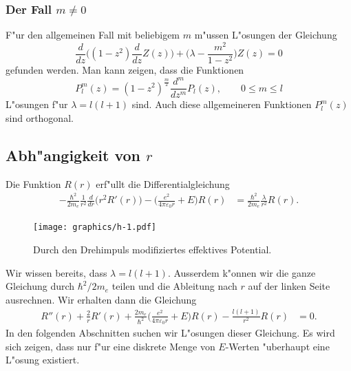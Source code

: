 \subsubsection{Der Fall $m\ne 0$}
F"ur den allgemeinen Fall mit beliebigem $m$ m"ussen L"osungen der
Gleichung
\begin{equation}
\frac{d}{dz}\biggl((1-z^2)\frac{d}{dz}Z(z)\biggr)
+\biggl(\lambda -\frac{m^2}{1-z^2}\biggr)Z(z)=0
\end{equation}
gefunden werden. Man kann zeigen, dass die Funktionen
\[
P_l^m(z)=
(1-z^2)^{\frac{m}2}\frac{d^m}{dz^m}P_l(z),
\qquad
0\le m\le l
\]
L"osungen f"ur $\lambda=l(l+1)$ sind.
Auch diese allgemeineren Funktionen $P_l^m(z)$ sind orthogonal.

\subsection{Abh"angigkeit von $r$}
Die Funktion $R(r)$ erf"ullt die Differentialgleichung
\begin{align}
-\frac{\hbar^2}{2m_e} \frac{1}{r^2}\frac{d}{dr}\bigl(r^2R'(r)\bigr)
-
\biggl(\frac{e^2}{4\pi\varepsilon_0r} + E \biggr) R(r)
&=
\frac{\hbar^2}{2m_e}\frac{\lambda}{r^2}
R(r).
\label{skript:radialgleichung}
\end{align}
\begin{figure}
\centering
\texttt{[image: graphics/h-1.pdf]}
\caption{Durch den Drehimpuls modifiziertes effektives Potential.
\label{skript:modifiziertes-potential}}
\end{figure}%
%
Wir wissen bereits, dass $\lambda=l(l+1)$.
Ausserdem k"onnen wir die ganze Gleichung durch $\hbar^2/2m_e$ teilen
und die Ableitung nach $r$ auf der linken Seite ausrechnen. 
Wir erhalten dann die Gleichung
\begin{align}
R''(r)+\frac{2}{r}R'(r)
+\frac{2m_e}{\hbar^2}
\biggl(\frac{e^2}{4\pi\varepsilon_0r} + E \biggr) R(r)
-\frac{l(l+1)}{r^2}
R(r)
&=0.
\label{skript:radialgleichung2}
\end{align}
In den folgenden Abschnitten suchen wir L"osungen dieser Gleichung.
Es wird sich zeigen, dass nur f"ur eine diskrete Menge von $E$-Werten
"uberhaupt eine L"osung existiert.

